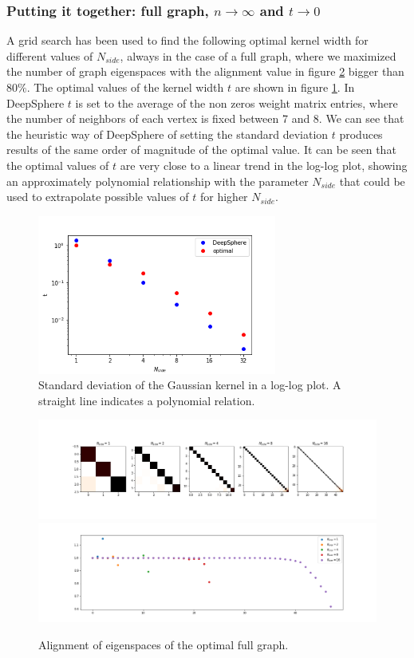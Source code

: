\subsubsection{Putting it together: full graph, $n\to\infty$ and $t\to 0$}
A grid search has been used to find the following optimal kernel width for different values of $N_{side}$, always in the case of a full graph, where we maximized the number of graph eigenspaces with the alignment value in figure \ref{fig:optimal graph} bigger than $80\%$. The optimal values of the kernel width $t$ are shown in figure \ref{fig:t}. In DeepSphere $t$ is set to the average of the non zeros weight matrix entries, where the number of neighbors of each vertex is fixed between 7 and 8. We can see that the heuristic way of DeepSphere of setting the standard deviation $t$ produces results of the same order of magnitude of the optimal value. It can be seen that the optimal values of $t$ are very close to a linear trend in the log-log plot, showing an approximately polynomial relationship with the parameter $N_{side}$ that could be used to extrapolate possible values of $t$ for higher $N_{side}$.
\begin{figure}[h]
	\centering
	\includegraphics[width=0.7\textwidth]{../codes/02.HeatKernelGraphLaplacian/HEALPix/06_figures/kernelwidth.png}
\caption{\label{fig:t}Standard deviation of the Gaussian kernel  in a log-log plot. A straight line indicates a polynomial relation.}
\end{figure}
\begin{figure}[h]
	\centering
	\includegraphics[width=\textwidth]{../codes/02.HeatKernelGraphLaplacian/HEALPix/06_figures/optimal_full.png}	
	\includegraphics[width=\textwidth]{../codes/02.HeatKernelGraphLaplacian/HEALPix/06_figures/optimal_full_diagonal.png}
\caption{\label{fig:optimal graph}Alignment of eigenspaces of the optimal full graph.}
\end{figure}
